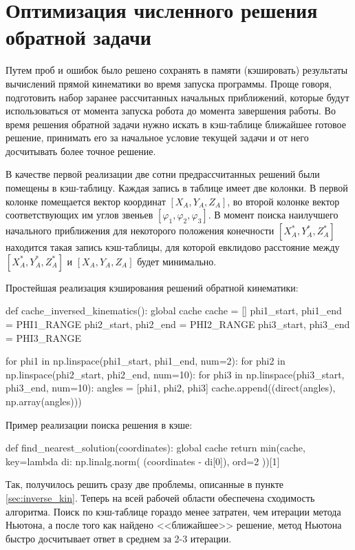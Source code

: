 \section{Оптимизация численного решения обратной задачи}

Путем проб и ошибок было решено сохранять в памяти (кэшировать) результаты вычислений прямой кинематики во время запуска программы. Проще говоря, подготовить набор заранее рассчитанных начальных приближений, которые будут использоваться от момента запуска робота до момента завершения работы. Во время решения обратной задачи нужно искать в кэш-таблице ближайшее готовое решение, принимать его за начальное условие текущей задачи и от него досчитывать более точное решение.

В качестве первой реализации две сотни предрассчитанных решений были помещены в кэш-таблицу. Каждая запись в таблице имеет две колонки. В первой колонке помещается вектор координат $ [X_A,Y_A,Z_A] $, во второй колонке вектор соответствующих им углов звеньев $ [\varphi_1, \varphi_2, \varphi_3] $. В момент поиска наилучшего начального приближения для некоторого положения конечности $ [X_A^*,Y_A^*,Z_A^*] $ находится такая запись кэш-таблицы, для которой евклидово расстояние между $ [X_A^*,Y_A^*,Z_A^*] $ и $ [X_A,Y_A,Z_A] $ будет минимально. 

\noindent Простейшая реализация кэширования решений обратной кинематики:

\begin{python}
def cache_inversed_kinematics():
    global cache
    cache = []
    phi1_start, phi1_end = PHI1_RANGE
    phi2_start, phi2_end = PHI2_RANGE
    phi3_start, phi3_end = PHI3_RANGE
    
    for phi1 in np.linspace(phi1_start, phi1_end, num=2):
        for phi2 in np.linspace(phi2_start, phi2_end, num=10):
            for phi3 in np.linspace(phi3_start, phi3_end, num=10):
                angles = [phi1, phi2, phi3]
                cache.append((direct(angles), np.array(angles)))
\end{python}

\noindent Пример реализации поиска решения в кэше:

\begin{python}
def find_nearest_solution(coordinates):
    global cache
    return min(cache, key=lambda di: np.linalg.norm(
        (coordinates - di[0]), 
        ord=2
    ))[1]
\end{python}

Так, получилось решить сразу две проблемы, описанные в пункте \ref{sec:inverse_kin}. Теперь на всей рабочей области обеспечена сходимость алгоритма. Поиск по кэш-таблице гораздо менее затратен, чем итерации метода Ньютона, а после того как найдено <<ближайшее>> решение, метод Ньютона быстро досчитывает ответ в среднем за 2-3 итерации.

